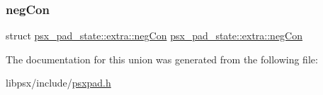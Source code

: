 \subsubsection{\texorpdfstring{neg\+Con}{negCon}}
{\footnotesize\ttfamily struct \hyperlink{structpsx__pad__state_1_1extra_1_1negCon}{psx\+\_\+pad\+\_\+state\+::extra\+::neg\+Con} \hyperlink{structpsx__pad__state_1_1extra_1_1negCon}{psx\+\_\+pad\+\_\+state\+::extra\+::neg\+Con}}



The documentation for this union was generated from the following file\+:\begin{DoxyCompactItemize}
\item 
libpsx/include/\hyperlink{psxpad_8h}{psxpad.\+h}\end{DoxyCompactItemize}
